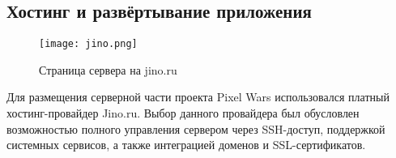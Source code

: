



\subsection{Хостинг и развёртывание приложения}

\begin{figure}[H]
    \texttt{[image: jino.png]}
    \caption{Страница сервера на jino.ru}
\end{figure}

Для размещения серверной части проекта Pixel Wars использовался платный хостинг-провайдер Jino.ru. Выбор данного провайдера был обусловлен возможностью полного управления сервером через SSH-доступ, поддержкой системных сервисов, а также интеграцией доменов и SSL-сертификатов. \cite{jino}

